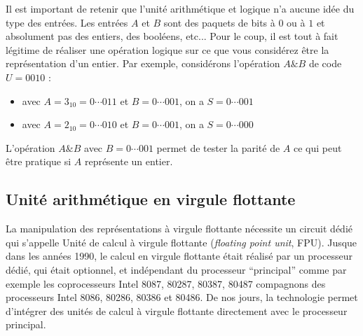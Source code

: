 Il est important de retenir que l'unité arithmétique et logique n'a aucune idée du type des entrées. Les entrées $A$ et $B$ sont des paquets de bits à $0$ ou à $1$ et absolument pas des entiers, des booléens, etc... Pour le coup, il est tout à fait légitime de réaliser une opération logique sur ce que vous considérez être la représentation d'un entier. Par exemple, considérons l'opération $A\& B$ de code $U = 0010$ :
\begin{itemize}
\item avec $A = 3_{10} = 0\cdots 011$ et $B = 0\cdots 001$, on a $S = 0\cdots001$
\item avec $A= 2_{10} = 0\cdots 010$ et $B = 0\cdots 001$, on a $S= 0\cdots 000$
\end{itemize}
L'opération $A\&B$ avec $B= 0\cdots 001$ permet de tester la parité de $A$ ce qui peut être pratique si $A$ représente un entier.







\subsection{Unité arithmétique en virgule flottante}

La manipulation des représentations à virgule flottante nécessite un circuit dédié qui s'appelle Unité de calcul à virgule flottante (\emph{floating point unit}, FPU). Jusque dans les années 1990, le calcul en virgule flottante était réalisé par un processeur dédié, qui était optionnel, et indépendant du processeur ``principal'' comme par exemple les coprocesseurs Intel 8087, 80287, 80387, 80487 compagnons des processeurs Intel 8086, 80286, 80386 et 80486. De nos jours, la technologie permet d'intégrer des unités de calcul à virgule flottante directement avec le processeur principal. 

